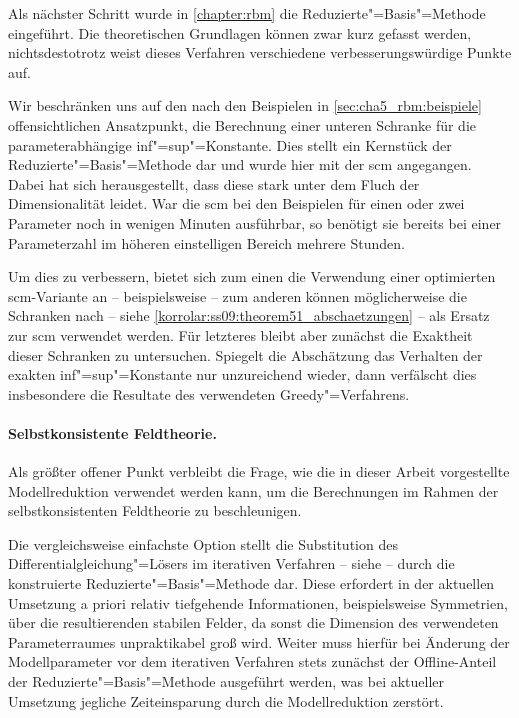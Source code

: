 \documentclass[../main.tex]{subfiles}
\begin{document}
Als nächster Schritt wurde in \cref{chapter:rbm} die Reduzierte"=Basis"=Methode eingeführt.
Die theoretischen Grundlagen können zwar kurz gefasst werden, nichtsdestotrotz weist dieses Verfahren verschiedene verbesserungswürdige Punkte auf.

Wir beschränken uns auf den nach den Beispielen in \cref{sec:cha5_rbm:beispiele} offensichtlichen Ansatzpunkt, die Berechnung einer unteren Schranke für die parameterabhängige inf"=sup"=Konstante.
Dies stellt ein Kernstück der Reduzierte"=Basis"=Methode dar und wurde hier mit der \acl{scm} angegangen.
Dabei hat sich herausgestellt, dass diese stark unter dem Fluch der Dimensionalität leidet.
War die \ac{scm} bei den Beispielen für einen oder zwei Parameter noch in wenigen Minuten ausführbar,
so benötigt sie bereits bei einer Parameterzahl im höheren einstelligen Bereich mehrere Stunden.

Um dies zu verbessern, bietet sich zum einen die Verwendung einer optimierten \ac{scm}-Variante an -- beispielsweise \cite{Huynh2010} -- zum anderen können möglicherweise die Schranken nach \cite{Schwab:2009ec} -- siehe \cref{korrolar:ss09:theorem51_abschaetzungen} -- als Ersatz zur \ac{scm} verwendet werden.
Für letzteres bleibt aber zunächst die Exaktheit dieser Schranken zu untersuchen.
Spiegelt die Abschätzung das Verhalten der exakten inf"=sup"=Konstante nur unzureichend wieder, dann verfälscht dies insbesondere die Resultate des verwendeten Greedy"=Verfahrens.


\paragraph{Selbstkonsistente Feldtheorie.} %
\label{par:selbstkonsistente_feldtheorie}

Als größter offener Punkt verbleibt die Frage, wie die in dieser Arbeit vorgestellte Modellreduktion verwendet werden kann, um die Berechnungen im Rahmen der selbstkonsistenten Feldtheorie zu beschleunigen.

Die vergleichsweise einfachste Option stellt die Substitution des Differentialgleichung"=Lösers im iterativen Verfahren  -- siehe  -- durch die konstruierte Reduzierte"=Basis"=Methode dar.
Diese erfordert in der aktuellen Umsetzung a priori relativ tiefgehende Informationen, beispielsweise Symmetrien, über die resultierenden stabilen Felder, da sonst die Dimension des verwendeten Parameterraumes unpraktikabel groß wird.
Weiter muss hierfür bei Änderung der Modellparameter vor dem iterativen Verfahren stets zunächst der Offline-Anteil der Reduzierte"=Basis"=Methode ausgeführt werden, was bei aktueller Umsetzung jegliche Zeiteinsparung durch die Modellreduktion zerstört.
\end{document}
